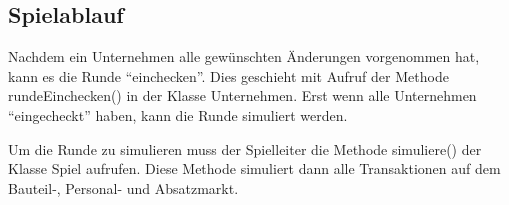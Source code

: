 \subsection{Spielablauf}
\label{sub:fachkonzept-implementierung-spielablauf}

Nachdem ein Unternehmen alle gewünschten Änderungen vorgenommen hat, kann es die Runde “einchecken”. Dies geschieht
mit Aufruf der Methode rundeEinchecken() in der Klasse Unternehmen. Erst wenn alle Unternehmen “eingecheckt” haben,
kann die Runde simuliert werden.

Um die Runde zu simulieren muss der Spielleiter die Methode simuliere() der Klasse Spiel aufrufen. Diese Methode
simuliert dann alle Transaktionen auf dem Bauteil-, Personal- und Absatzmarkt.